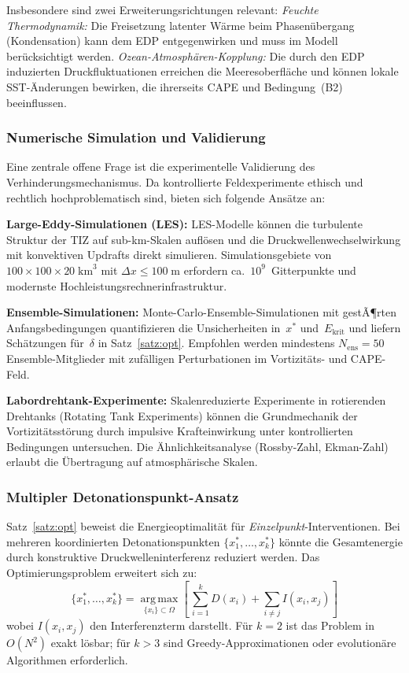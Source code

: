﻿\documentclass[a4paper,12pt]{article}
\theoremstyle{definition}
\begin{document}
Insbesondere sind zwei Erweiterungsrichtungen relevant:
\emph{Feuchte Thermodynamik:} Die Freisetzung latenter W\"{a}rme beim
Phasen\"{u}bergang (Kondensation) kann dem EDP entgegenwirken
und muss im Modell ber\"{u}cksichtigt werden.
\emph{Ozean-Atmosph\"{a}ren-Kopplung:} Die durch den EDP induzierten
Druckfluktuationen erreichen die Meeresoberfl\"{a}che und k\"{o}nnen
lokale SST-\"{A}nderungen bewirken, die ihrerseits CAPE und Bedingung~(B2)
beeinflussen.

\subsubsection{Numerische Simulation und Validierung}

Eine zentrale offene Frage ist die experimentelle Validierung des
Verhinderungsmechanismus.
Da kontrollierte Feldexperimente ethisch und rechtlich hochproblematisch sind,
bieten sich folgende Ans\"{a}tze an:

\textbf{Large-Eddy-Simulationen (LES):}
LES-Modelle k\"{o}nnen die turbulente Struktur der TIZ auf sub-km-Skalen
aufl\"{o}sen und die Druckwellenwechselwirkung mit konvektiven Updrafts
direkt simulieren.
Simulationsgebiete von $100\times100\times20\;\mathrm{km}^{3}$
mit $\Delta x\leq 100\;\mathrm{m}$ erfordern ca.\ $10^{9}$~Gitterpunkte
und modernste Hochleistungsrechnerinfrastruktur.

\textbf{Ensemble-Simulationen:}
Monte-Carlo-Ensemble-Simulationen mit gestÃ¶rten Anfangsbedingungen
quantifizieren die Unsicherheiten in~$x^{*}$ und~$E_{\mathrm{krit}}$
und liefern Sch\"{a}tzungen f\"{u}r~$\delta$ in Satz~\ref{satz:opt}.
Empfohlen werden mindestens $N_{\mathrm{ens}}=50$ Ensemble-Mitglieder
mit zuf\"{a}lligen Perturbationen im Vortizit\"{a}ts- und CAPE-Feld.

\textbf{Labordrehtank-Experimente:}
Skalenreduzierte Experimente in rotierenden Drehtanks
(Rotating Tank Experiments) k\"{o}nnen die Grundmechanik der
Vortizit\"{a}tsst\"{o}rung durch impulsive Krafteinwirkung unter
kontrollierten Bedingungen untersuchen.
Die \"{A}hnlichkeitsanalyse (Rossby-Zahl, Ekman-Zahl) erlaubt
die \"{U}bertragung auf atmosph\"{a}rische Skalen.

\subsubsection{Multipler Detonationspunkt-Ansatz}

Satz~\ref{satz:opt} beweist die Energieoptimalit\"{a}t f\"{u}r
\emph{Einzelpunkt}-Interventionen.
Bei mehreren koordinierten Detonationspunkten
$\{x_{1}^{*},\ldots,x_{k}^{*}\}$ k\"{o}nnte die Gesamtenergie durch
konstruktive Druckwelleninterferenz reduziert werden.
Das Optimierungsproblem erweitert sich zu:
\[
    \{x_{1}^{*},\ldots,x_{k}^{*}\}
    =\operatorname*{arg\,max}_{\{x_{i}\}\subset\Omega}
    \left[\,\sum_{i=1}^{k}D(x_{i})+\sum_{i\neq j}I(x_{i},x_{j})\right]
\]
wobei $I(x_{i},x_{j})$ den Interferenzterm darstellt.
F\"{u}r $k=2$ ist das Problem in $O(N^{2})$ exakt l\"{o}sbar;
f\"{u}r $k>3$ sind Greedy-Approximationen oder evolution\"{a}re
Algorithmen erforderlich.
\end{document}

